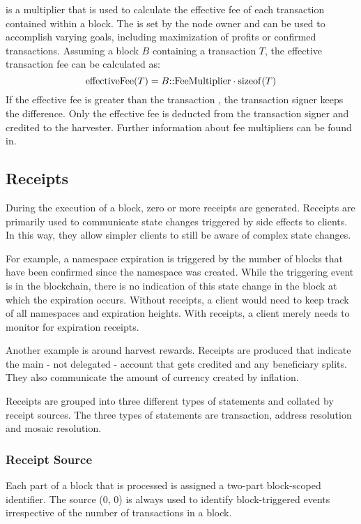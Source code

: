  is a multiplier that is used to calculate the effective fee of each transaction contained within a block.
The  is set by the node owner and can be used to accomplish varying goals, including maximization of profits or confirmed transactions.
Assuming a block $B$ containing a transaction $T$, the effective transaction fee can be calculated as:
$$\mathrm{effectiveFee}(T) = B\mathrm{{::}FeeMultiplier} \cdot \mathrm{sizeof}(T)$$
If the effective fee is greater than the transaction , the transaction signer keeps the difference.
Only the effective fee is deducted from the transaction signer and credited to the harvester.
Further information about fee multipliers can be found in.

\subsection{Receipts}
\label{sec:blocks:receipts}

During the execution of a block, zero or more receipts are generated.
Receipts are primarily used to communicate state changes triggered by side effects to clients.
In this way, they allow simpler clients to still be aware of complex state changes.

For example, a namespace expiration is triggered by the number of blocks that have been confirmed since the namespace was created.
While the triggering event is in the blockchain, there is no indication of this state change in the block at which the expiration occurs.
Without receipts, a client would need to keep track of all namespaces and expiration heights.
With receipts, a client merely needs to monitor for expiration receipts.

Another example is around harvest rewards.
Receipts are produced that indicate the main - not delegated - account that gets credited and any beneficiary splits.
They also communicate the amount of currency created by inflation.

Receipts are grouped into three different types of statements and collated by receipt sources.
The three types of statements are transaction, address resolution and mosaic resolution.

\subsubsection{Receipt Source}

Each part of a block that is processed is assigned a two-part block-scoped identifier.
The source (0, 0) is always used to identify block-triggered events irrespective of the number of transactions in a block.

